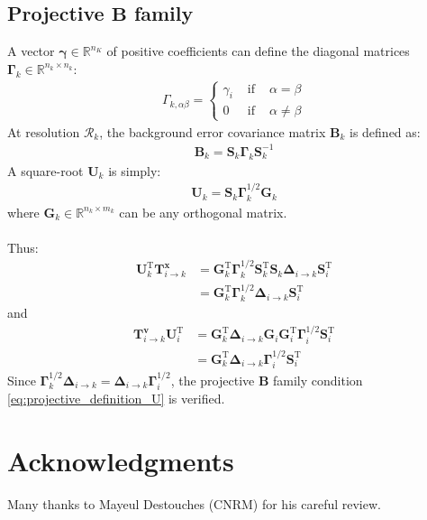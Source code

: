 \documentclass[12pt]{scrartcl}
\begin{document}
\subsection{Projective $\mathbf{B}$ family}
A vector $\boldsymbol{\gamma} \in \mathbb{R}^{n_K}$ of positive coefficients can define the diagonal matrices $\boldsymbol{\Gamma}_k \in \mathbb{R}^{n_k \times n_k}$:
\begin{align}
\Gamma_{k,\alpha \beta} = \left\{
\begin{array}{ccc}
\gamma_i & \text{ if } & \alpha = \beta \\
0 & \text{ if } & \alpha \ne \beta
\end{array}\right.
\end{align}
At resolution $\mathcal{R}_k$, the background error covariance matrix $\mathbf{B}_k$ is defined as:
\begin{align}
\mathbf{B}_k = \mathbf{S}_k \boldsymbol{\Gamma}_k \mathbf{S}_k^{-1}
\end{align}
A square-root $\mathbf{U}_k$ is simply:
\begin{align}
\mathbf{U}_k = \mathbf{S}_k \boldsymbol{\Gamma}_k^{1/2} \mathbf{G}_k
\end{align}
where $\mathbf{G}_k \in \mathbb{R}^{n_k \times m_k}$ can be any orthogonal matrix.\\
$  $\\
Thus:
\begin{align}
\mathbf{U}_k^\mathrm{T} \mathbf{T}^\mathbf{x}_{i \rightarrow k} & = \mathbf{G}^\mathrm{T}_k \boldsymbol{\Gamma}_k^{1/2} \mathbf{S}^\mathrm{T}_k \mathbf{S}_k \boldsymbol{\Delta}_{i \rightarrow k} \mathbf{S}^\mathrm{T}_i \nonumber \\
 & = \mathbf{G}^\mathrm{T}_k \boldsymbol{\Gamma}_k^{1/2}\boldsymbol{\Delta}_{i \rightarrow k} \mathbf{S}^\mathrm{T}_i
\end{align}
and
\begin{align}
\mathbf{T}^\mathbf{v}_{i \rightarrow k} \mathbf{U}_i^\mathrm{T} & = \mathbf{G}^\mathrm{T}_k \boldsymbol{\Delta}_{i \rightarrow k} \mathbf{G}_i \mathbf{G}^\mathrm{T}_i \boldsymbol{\Gamma}_i^{1/2} \mathbf{S}^\mathrm{T}_i \nonumber \\
& = \mathbf{G}^\mathrm{T}_k \boldsymbol{\Delta}_{i \rightarrow k}  \boldsymbol{\Gamma}_i^{1/2} \mathbf{S}^\mathrm{T}_i
\end{align}
Since $\boldsymbol{\Gamma}_k^{1/2}\boldsymbol{\Delta}_{i \rightarrow k} = \boldsymbol{\Delta}_{i \rightarrow k}  \boldsymbol{\Gamma}_i^{1/2}$, the projective $\mathbf{B}$ family condition \eqref{eq:projective_definition_U} is verified.

\section*{Acknowledgments}
Many thanks to Mayeul Destouches (CNRM) for his careful review.
\end{document}
